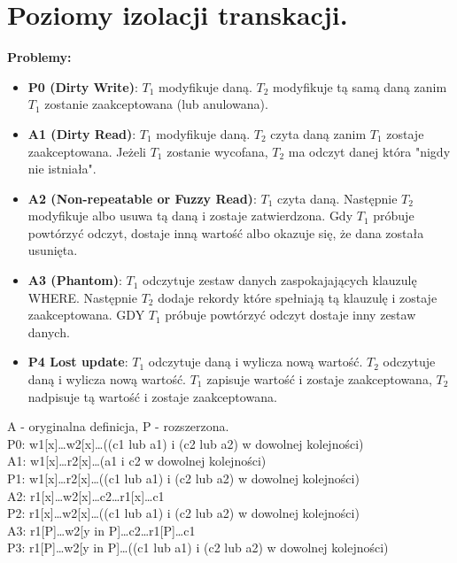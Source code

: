 \documentclass[a4paper]{article}
\begin{document}
    \section{Poziomy izolacji transkacji.}
    \textbf{Problemy:}
    \begin{itemize}[noitemsep]
        \item \textbf{P0 (Dirty Write)}: $T_1$ modyfikuje daną. $T_2$ modyfikuje tą samą daną zanim $T_1$ zostanie
        zaakceptowana (lub anulowana).
        \item \textbf{A1 (Dirty Read)}: $T_1$ modyfikuje daną. $T_2$ czyta daną zanim $T_1$ zostaje zaakceptowana.
        Jeżeli $T_1$ zostanie wycofana, $T_2$ ma odczyt danej która "nigdy nie istniała".
        \item \textbf{A2 (Non-repeatable or Fuzzy Read)}: $T_1$ czyta daną. Następnie $T_2$ modyfikuje albo usuwa tą
        daną i zostaje zatwierdzona. Gdy $T_1$ próbuje powtórzyć odczyt, dostaje inną wartość albo okazuje się, że dana
        została usunięta.
        \item \textbf{A3 (Phantom)}: $T_1$ odczytuje zestaw danych zaspokajających klauzulę WHERE. Następnie $T_2$
        dodaje rekordy które spełniają tą klauzulę i zostaje zaakceptowana. GDY $T_1$ próbuje powtórzyć odczyt dostaje
        inny zestaw danych.
        \item \textbf{P4 Lost update}: $T_1$ odczytuje daną i wylicza nową wartość. $T_2$ odczytuje daną i wylicza nową
        wartość. $T_1$ zapisuje wartość i zostaje zaakceptowana, $T_2$ nadpisuje tą wartość i zostaje zaakceptowana.
    \end{itemize}

    A - oryginalna definicja, P - rozszerzona.\\

    P0: w1[x]\ldots w2[x]\ldots ((c1 lub a1) i (c2 lub a2) w dowolnej kolejności)\\

    A1: w1[x]\ldots r2[x]\ldots (a1 i c2 w dowolnej kolejności)\\
    P1: w1[x]\ldots r2[x]\ldots ((c1 lub a1) i (c2 lub a2) w dowolnej kolejności)\\

    A2: r1[x]\ldots w2[x]\ldots c2\ldots r1[x]\ldots c1\\
    P2: r1[x]\ldots w2[x]\ldots ((c1 lub a1) i (c2 lub a2) w dowolnej kolejności)\\

    A3: r1[P]\ldots w2[y in P]\ldots c2\ldots r1[P]\ldots c1\\
    P3: r1[P]\ldots w2[y in P]\ldots ((c1 lub a1) i (c2 lub a2) w dowolnej kolejności)\\
\end{document}
